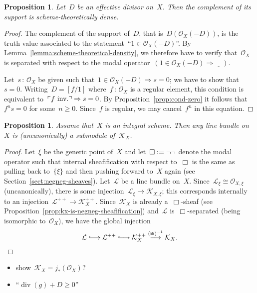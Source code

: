 \documentclass[10pt]{amsart}
\makeatletter
\theoremstyle{definition}
\theoremstyle{plain}
\newtheorem{prop}[defn]{Proposition}
\theoremstyle{remark}
\renewcommand{\O}{\mathcal{O}}
\newcommand{\K}{\mathcal{K}}
\renewcommand{\L}{\mathcal{L}}
\newcommand{\placeholder}{\underline{\quad}}
\newcommand{\?}{\,{:}\,}
\renewcommand{\_}{\mathpunct{.}\,}
\newcommand{\speak}[1]{\ulcorner\text{\textnormal{#1}}\urcorner}
\newcommand{\lhra}{\ensuremath{\lhook\joinrel\relbar\joinrel\rightarrow}}
\newcommand{\inv}{inv.\@}
\newcommand{\defeq}{\vcentcolon=}
\makeatother
\begin{document}
\begin{prop}Let~$D$ be an effective divisor on~$X$. Then the complement of its
support is scheme-theoretically dense.\end{prop}
\begin{proof}The complement of the support of~$D$, that is~$D(\O_X(-D))$, is
the truth value associated to the statement~``$1 \in \O_X(-D)$''. By
Lemma~\ref{lemma:scheme-theoretical-density}, we therefore have to verify
that~$\O_X$ is separated with respect to the modal operator~$(1 \in \O_X(-D)
\Rightarrow \placeholder)$.

Let~$s \? \O_X$ be given such that~$1 \in \O_X(-D) \Rightarrow s = 0$; we have
to show that~$s = 0$. Writing~$D = [f/1]$ where~$f \? \O_X$ is a regular
element, this condition is equivalent to~$\speak{$f$ \inv} \Rightarrow s = 0$.
By Proposition~\ref{prop:cond-zero} it follows that~$f^n s = 0$ for some~$n
\geq 0$. Since~$f$ is regular, we may cancel~$f^n$ in this equation.
\end{proof}

\begin{prop}Assume that~$X$ is an integral scheme. Then any line bundle on~$X$
is (uncanonically) a submodule of~$\K_X$.\end{prop}
\begin{proof}Let~$\xi$ be the generic point of~$X$ and let~$\Box \defeq \neg\neg$
denote the modal operator such that internal sheafification with respect
to~$\Box$ is the same as pulling back to~$\{\xi\}$ and then pushing forward
to~$X$ again (see Section~\ref{sect:negneg-sheaves}). Let~$\L$ be a line bundle on~$X$. Since~$\L_\xi \cong
\O_{X,\xi}$ (uncanonically), there is some injection~$\L_\xi \to \K_{X,\xi}$;
this corresponds internally to an injection~$\L^{++} \to \K_X^{++}$.
Since~$\K_X$ is already a~$\Box$-sheaf (see
Proposition~\ref{prop:kx-is-negneg-sheafification}) and~$\L$ is~$\Box$-separated
(being isomorphic to~$\O_X$), we have the global injection
\[ \L \lhra \L^{++} \lhra \K_X^{++} \stackrel{({\cong})^{-1}}{\longrightarrow} \K_X. \qedhere \]
\end{proof}

\begin{itemize}
\item show~$\K_X = j_*(\O_X)$?
\item ``$\operatorname{div}(g) + D \geq 0$''
\end{itemize}
\end{document}
